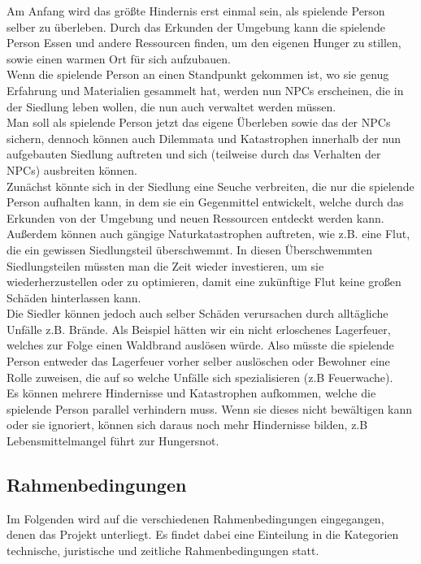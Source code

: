 \documentclass[paper=A4,pagesize=auto,12pt,headinclude=true,footinclude=true,BCOR=0mm,DIV=calc]{scrartcl}
\newcommand{\sectionspace}{
	\vspace{0.5cm}
}
\begin{document}
Am Anfang wird das größte Hindernis erst einmal sein, als spielende Person selber zu überleben.
Durch das Erkunden der Umgebung kann die spielende Person Essen und andere Ressourcen finden, um den eigenen Hunger zu stillen, sowie einen warmen Ort für sich aufzubauen.\\
Wenn die spielende Person an einen Standpunkt gekommen ist, wo sie genug Erfahrung und Materialien gesammelt hat, werden nun NPCs erscheinen, die in der Siedlung leben wollen, die nun auch verwaltet werden müssen.\\
Man soll als spielende Person jetzt das eigene Überleben sowie das der NPCs sichern, dennoch können auch Dilemmata und Katastrophen innerhalb der nun aufgebauten Siedlung auftreten und sich (teilweise durch das Verhalten der NPCs) ausbreiten können.\\
Zunächst könnte sich in der Siedlung eine Seuche verbreiten, die nur die spielende Person aufhalten kann, in dem sie ein Gegenmittel entwickelt, welche durch das Erkunden von der Umgebung und neuen Ressourcen entdeckt werden kann.\\
Außerdem können auch gängige Naturkatastrophen auftreten, wie z.B. eine Flut, die ein gewissen Siedlungsteil überschwemmt. In diesen Überschwemmten Siedlungsteilen müssten man die Zeit wieder investieren, um sie wiederherzustellen oder zu optimieren, damit eine zukünftige Flut keine großen Schäden hinterlassen kann.\\
Die Siedler können jedoch auch selber Schäden verursachen durch alltägliche Unfälle z.B. Brände. Als Beispiel hätten wir ein nicht erloschenes Lagerfeuer, welches zur Folge einen Waldbrand auslösen würde. Also müsste die spielende Person entweder das Lagerfeuer vorher selber auslöschen oder Bewohner eine Rolle zuweisen, die auf so welche Unfälle sich spezialisieren (z.B Feuerwache). \\
Es können mehrere Hindernisse und Katastrophen aufkommen, welche die spielende Person parallel verhindern muss. Wenn sie dieses nicht bewältigen kann oder sie ignoriert, können sich daraus noch mehr Hindernisse bilden, z.B Lebensmittelmangel führt zur Hungersnot.

\sectionspace
\subsection{Rahmenbedingungen}\label{sec:Rahmenbedingungen}
Im Folgenden wird auf die verschiedenen Rahmenbedingungen eingegangen, denen das Projekt unterliegt. Es findet dabei eine Einteilung in die Kategorien technische, juristische und zeitliche Rahmenbedingungen statt. %
\end{document}
